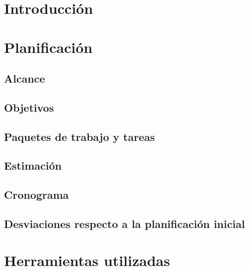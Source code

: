 \documentclass[a4paper,11pt]{memoir}
\begin{document}
\tableofcontents
\cleardoublepage
\listoffigures
\cleardoublepage
\listoftables
\cleardoublepage

\mainmatter
\pagestyle{ruled}


\chapter{Introducción}

\chapter{Planificación}

\section{Alcance}

\clearpage
\section{Objetivos}

\section{Paquetes de trabajo y tareas}

\clearpage
\section{Estimación}

\section{Cronograma}

\section{Desviaciones respecto a la planificación inicial}

\cleardoublepage

\chapter{Herramientas utilizadas}

\end{document}
